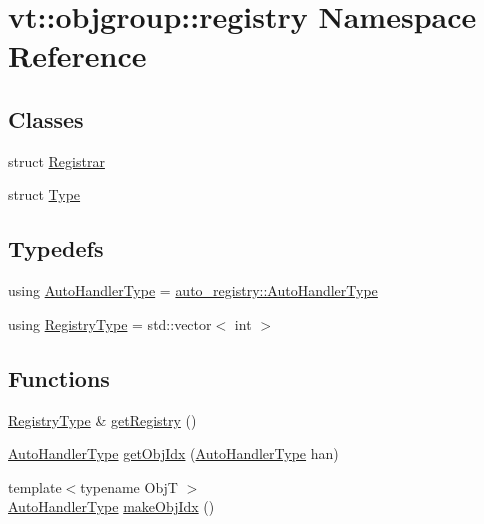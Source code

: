 \hypertarget{namespacevt_1_1objgroup_1_1registry}{}\section{vt\+:\+:objgroup\+:\+:registry Namespace Reference}
\label{namespacevt_1_1objgroup_1_1registry}
\subsection*{Classes}
\begin{DoxyCompactItemize}
\item 
struct \hyperlink{structvt_1_1objgroup_1_1registry_1_1_registrar}{Registrar}
\item 
struct \hyperlink{structvt_1_1objgroup_1_1registry_1_1_type}{Type}
\end{DoxyCompactItemize}
\subsection*{Typedefs}
\begin{DoxyCompactItemize}
\item 
using \hyperlink{namespacevt_1_1objgroup_1_1registry_ab61bb18a54c83c090d49a1a7f6f30037}{Auto\+Handler\+Type} = \hyperlink{namespacevt_1_1auto__registry_ae295e18699146815bb7d7674594d95d7}{auto\+\_\+registry\+::\+Auto\+Handler\+Type}
\item 
using \hyperlink{namespacevt_1_1objgroup_1_1registry_abefb624bedde3ece3acdd759934ce541}{Registry\+Type} = std\+::vector$<$ int $>$
\end{DoxyCompactItemize}
\subsection*{Functions}
\begin{DoxyCompactItemize}
\item 
\hyperlink{namespacevt_1_1objgroup_1_1registry_abefb624bedde3ece3acdd759934ce541}{Registry\+Type} \& \hyperlink{namespacevt_1_1objgroup_1_1registry_a6aaccd35cb1d15d28d505c2fa4aad3e3}{get\+Registry} ()
\item 
\hyperlink{namespacevt_1_1objgroup_1_1registry_ab61bb18a54c83c090d49a1a7f6f30037}{Auto\+Handler\+Type} \hyperlink{namespacevt_1_1objgroup_1_1registry_a07ab285a7f000924ed679c78e5004ff4}{get\+Obj\+Idx} (\hyperlink{namespacevt_1_1objgroup_1_1registry_ab61bb18a54c83c090d49a1a7f6f30037}{Auto\+Handler\+Type} han)
\item 
{\footnotesize template$<$typename ObjT $>$ }\\\hyperlink{namespacevt_1_1objgroup_1_1registry_ab61bb18a54c83c090d49a1a7f6f30037}{Auto\+Handler\+Type} \hyperlink{namespacevt_1_1objgroup_1_1registry_aa614a5ba15bf7eebf585b253f20f40af}{make\+Obj\+Idx} ()
\end{DoxyCompactItemize}


